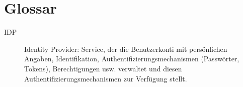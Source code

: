 \section*{Glossar}

\begin{description}
    \item[IDP] Identity Provider: Service, der die Benutzerkonti mit persönlichen Angaben, Identifikation, Authentifizierungsmechanismen (Passwörter, Tokens), Berechtigungen usw. verwaltet und diesen Authentifizierungsmechanismen zur Verfügung stellt.
\end{description}
